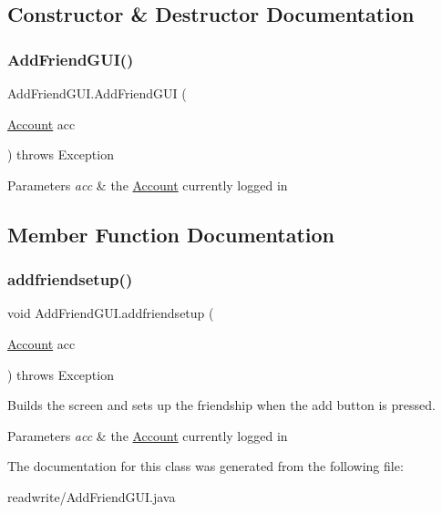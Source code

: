 \subsection{Constructor \& Destructor Documentation}
\mbox{\label{class_add_friend_g_u_i_ac389076c7c3445b2aa7bc426962b3d50}} 
\subsubsection{\texorpdfstring{Add\+Friend\+G\+U\+I()}{AddFriendGUI()}}
{\footnotesize\ttfamily Add\+Friend\+G\+U\+I.\+Add\+Friend\+G\+UI (\begin{DoxyParamCaption}\item[{\hyperlink{class_account}{Account}}]{acc }\end{DoxyParamCaption}) throws Exception}


\begin{DoxyParams}{Parameters}
{\em acc} & the \hyperlink{class_account}{Account} currently logged in \\
\hline
\end{DoxyParams}


\subsection{Member Function Documentation}
\mbox{\label{class_add_friend_g_u_i_a5771685be048ff39517351ff19400104}} 
\subsubsection{\texorpdfstring{addfriendsetup()}{addfriendsetup()}}
{\footnotesize\ttfamily void Add\+Friend\+G\+U\+I.\+addfriendsetup (\begin{DoxyParamCaption}\item[{\hyperlink{class_account}{Account}}]{acc }\end{DoxyParamCaption}) throws Exception}



Builds the screen and sets up the friendship when the add button is pressed. 


\begin{DoxyParams}{Parameters}
{\em acc} & the \hyperlink{class_account}{Account} currently logged in \\
\hline
\end{DoxyParams}


The documentation for this class was generated from the following file\+:\begin{DoxyCompactItemize}
\item 
readwrite/Add\+Friend\+G\+U\+I.\+java\end{DoxyCompactItemize}
